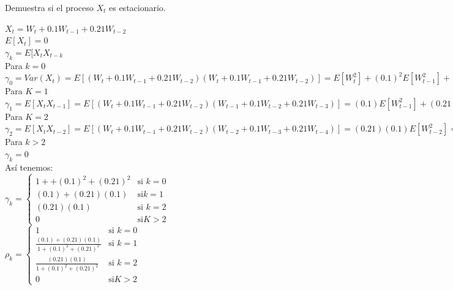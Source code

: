 \documentclass{article}
\begin{document}
Demuestra si el proceso $X_t$ es estacionario.

$X_t = W_t + 0.1W_{t-1} +0.21W_{t-2} $\\

$E[X_t] = 0 $\\

$\gamma_k = E[X_t X_{t-k}$ \\

Para $k=0$\\

$\gamma_0 = Var(X_t)= E[(W_t + 0.1W_{t-1} +0.21W_{t-2})(W_t + 0.1W_{t-1} +0.21W_{t-2})] = E[W_t^2]+(0.1)^2E[W_{t-1}^2]+(0.21)^2E[W_{t-2}^2] = 1 + +(0.1)^2+(0.21)^2$\\

Para $K=1$ \\

$\gamma_1 = E[X_t X_{t-1}] = E[(W_t + 0.1W_{t-1} +0.21W_{t-2})(W_{t-1} + 0.1W_{t-2} +0.21W_{t-3})] = (0.1)E[W_{t-1}^2]+(0.21)(0.1)E[W_{t-2}^2] = (0.1)+(0.21)(0.1) $\\

Para $K=2$ \\

$\gamma_2 = E[X_t X_{t-2}] = E[(W_t + 0.1W_{t-1} +0.21W_{t-2})(W_{t-2} + 0.1W_{t-3} +0.21W_{t-4})] = (0.21)(0.1)E[W_{t-2} ^2] =(0.21)(0.1)$  \\

Para $k>2$ \\

$ \gamma_k = 0 $\\

As{í} tenemos:\\

$\gamma_{k} = \left\{\begin{array}{rl}  1 + +(0.1)^2+(0.21)^2 & \text{si } k =0  \\ (0.1)+(0.21)(0.1) & \text{si} k =1 \\  (0.21)(0.1) & \text{si } k =2 \\  0  & \text{si}  K>2 \end{array} \right. $\\

$\rho_{k} = \left\{\begin{array}{rl}  1 & \text{si } k =0  \\ \frac{(0.1)+(0.21)(0.1)}{1+(0.1)^2+(0.21)^2} & \text{si } k =1 \\  \frac{(0.21)(0.1)}{1+(0.1)^2+(0.21)^2} & \text{si } k =2 \\  0  & \text{si}  K>2 \end{array} \right. $\\
\end{document}

